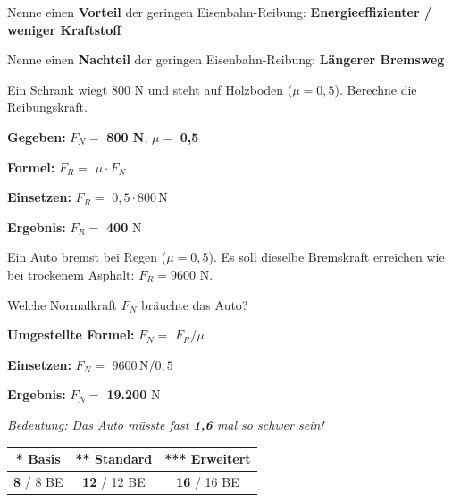 \documentclass[a4paper,11pt]{article}
\newcommand{\stern}[1]{\textcolor{warning}{\textbf{#1}}}
\newcommand{\lsg}[1]{\textcolor{loesung}{\textbf{#1}}}
\begin{document}
Nenne einen \textbf{Vorteil} der geringen Eisenbahn-Reibung: \lsg{Energieeffizienter / weniger Kraftstoff}

Nenne einen \textbf{Nachteil} der geringen Eisenbahn-Reibung: \lsg{Längerer Bremsweg}

\vspace{3mm}


\begin{tcolorbox}[colback=white, colframe=warning, boxrule=1pt, arc=0pt,
    title={\textbf{R1: Rechnung \stern{**}}}, fonttitle=\normalsize, coltitle=black, colbacktitle=white]
Ein Schrank wiegt 800 N und steht auf Holzboden ($\mu = 0{,}5$). Berechne die Reibungskraft.

\textbf{Gegeben:} $F_N = $ \lsg{800 N}, $\mu = $ \lsg{0,5}

\textbf{Formel:} $F_R = $ \lsg{$\mu \cdot F_N$}

\textbf{Einsetzen:} $F_R = $ \lsg{$0{,}5 \cdot 800\,\text{N}$}

\textbf{Ergebnis:} $F_R = $ \lsg{400} N
\end{tcolorbox}

\vspace{2mm}


\begin{tcolorbox}[colback=white, colframe=warning, boxrule=1pt, arc=0pt,
    title={\textbf{R2: Umstellen \stern{***}}}, fonttitle=\normalsize, coltitle=black, colbacktitle=white]
Ein Auto bremst bei Regen ($\mu = 0{,}5$). Es soll dieselbe Bremskraft erreichen wie bei trockenem Asphalt: $F_R = 9600$ N.

Welche Normalkraft $F_N$ bräuchte das Auto?

\textbf{Umgestellte Formel:} $F_N = $ \lsg{$F_R / \mu$}

\textbf{Einsetzen:} $F_N = $ \lsg{$9600\,\text{N} / 0{,}5$}

\textbf{Ergebnis:} $F_N = $ \lsg{19.200} N

\textit{Bedeutung: Das Auto müsste fast \lsg{1,6} mal so schwer sein!}
\end{tcolorbox}

\vspace{3mm}


\begin{center}
\begin{tabular}{|c|c|c|}
\hline
\rowcolor{white}
\textbf{\stern{*} Basis} & \textbf{\stern{**} Standard} & \textbf{\stern{***} Erweitert} \\
\hline
\lsg{8} / 8 BE & \lsg{12} / 12 BE & \lsg{16} / 16 BE \\
\hline
\end{tabular}
\end{center}
\end{document}
